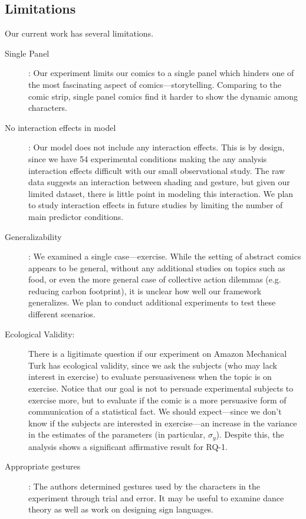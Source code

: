 \subsection{Limitations}
Our current work has several limitations.
\begin{description}
 \item[Single Panel]: Our experiment limits our comics to a single panel which hinders one of the most fascinating aspect of comics---storytelling. Comparing to the comic strip, single panel comics find it harder to show the dynamic among characters.
 \item[No interaction effects in model]: Our model does not include any interaction effects. This is by design, since we have 54 experimental conditions making the any analysis interaction effects difficult with our small observational study. The raw data suggests an interaction between shading and gesture, but given our limited dataset, there is little point in modeling this interaction. We plan to study interaction effects in future studies by limiting the number of main predictor conditions.
 \item[Generalizability]: We examined a single case---exercise. While the setting of abstract comics appears to be general, without any additional studies on topics such as food, or even the more general case of collective action dilemmas (e.g. reducing carbon footprint), it is unclear how well our framework generalizes. We plan to conduct additional experiments to test these different scenarios.
 \item[Ecological Validity:] There is a ligitimate question if our experiment on Amazon Mechanical Turk has ecological validity, since we ask the subjects (who may lack  interest in exercise) to evaluate persuasiveness when the topic is on exercise. Notice that our goal is not to persuade experimental subjects to exercise more, but to evaluate if the comic is a more persuasive form of communication of a statistical fact. We should expect---since we don't know if the subjects are interested in exercise---an increase in the variance in the estimates of the parameters (in particular,  $\sigma_y$). Despite this, the analysis shows a significant affirmative result for RQ-1.
 \item[Appropriate gestures]: The authors determined gestures used by the characters in the experiment through trial and error. It may be useful to examine dance theory as well as work on designing sign languages.
\end{description}

